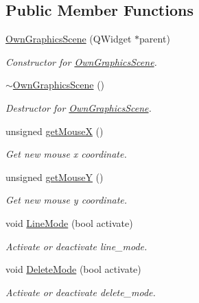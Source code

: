 \subsection*{Public Member Functions}
\begin{DoxyCompactItemize}
\item 
\mbox{\hyperlink{classOwnGraphicsScene_a242b82147a469314e4c7fb5af69c265f}{Own\+Graphics\+Scene}} (Q\+Widget $\ast$parent)
\begin{DoxyCompactList}\small\item\em Constructor for \mbox{\hyperlink{classOwnGraphicsScene}{Own\+Graphics\+Scene}}. \end{DoxyCompactList}\item 
\mbox{\label{classOwnGraphicsScene_a4c77674db1854f2b228c7aefbd9ea688}} 
\mbox{\hyperlink{classOwnGraphicsScene_a4c77674db1854f2b228c7aefbd9ea688}{$\sim$\+Own\+Graphics\+Scene}} ()
\begin{DoxyCompactList}\small\item\em Destructor for \mbox{\hyperlink{classOwnGraphicsScene}{Own\+Graphics\+Scene}}. \end{DoxyCompactList}\item 
unsigned \mbox{\hyperlink{classOwnGraphicsScene_a6e54bd43db758bcd4f7cc1dd4544232e}{get\+MouseX}} ()
\begin{DoxyCompactList}\small\item\em Get new mouse x coordinate. \end{DoxyCompactList}\item 
unsigned \mbox{\hyperlink{classOwnGraphicsScene_a3fd2942e9930fc2dda41844622dc8a35}{get\+MouseY}} ()
\begin{DoxyCompactList}\small\item\em Get new mouse y coordinate. \end{DoxyCompactList}\item 
void \mbox{\hyperlink{classOwnGraphicsScene_a6b7e69131827f0ae64626af378ff9974}{Line\+Mode}} (bool activate)
\begin{DoxyCompactList}\small\item\em Activate or deactivate line\+\_\+mode. \end{DoxyCompactList}\item 
void \mbox{\hyperlink{classOwnGraphicsScene_aca454942ecf6c472d020e063862464d4}{Delete\+Mode}} (bool activate)
\begin{DoxyCompactList}\small\item\em Activate or deactivate delete\+\_\+mode. \end{DoxyCompactList}\item 

\end{DoxyCompactItemize}
